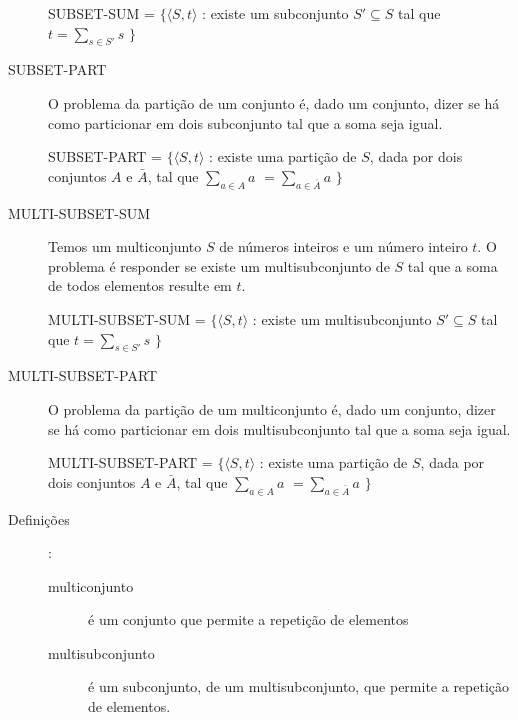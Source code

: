 \documentclass[12pt]{article}
\begin{document}
\begin{description}
SUBSET-SUM = $\{\langle S,t\rangle$ : existe um subconjunto $S'\subseteq S$ tal que $t = \sum_{s\in S'}s$ $\}$

\item[SUBSET-PART]

O problema da partição de um conjunto é, dado um conjunto, dizer se há como particionar em dois subconjunto tal que a soma seja igual.

SUBSET-PART = $\{\langle S,t\rangle$ : existe uma partição de $S$, dada por dois conjuntos $A$ e $\bar{A}$, tal que $\sum_{a\in A}a$ $ = \sum_{a\in \bar{A}} a$ $\}$

\item[MULTI-SUBSET-SUM]

Temos um multiconjunto $S$ de números inteiros e um número inteiro $t$. O problema é responder se existe um multisubconjunto de $S$ tal que a soma de todos elementos resulte em $t$.

MULTI-SUBSET-SUM = $\{\langle S,t\rangle$ : existe um multisubconjunto $S'\subseteq S$ tal que $t = \sum_{s\in S'}s$ $\}$

\item[MULTI-SUBSET-PART]

O problema da partição de um multiconjunto é, dado um conjunto, dizer se há como particionar em dois multisubconjunto tal que a soma seja igual.

MULTI-SUBSET-PART = $\{\langle S,t\rangle$ : existe uma partição de $S$, dada por dois conjuntos $A$ e $\bar{A}$, tal que $\sum_{a\in A}a$ $ = \sum_{a\in \bar{A}} a$ $\}$

\item[Definições]:

\begin{description}

\item[multiconjunto] é um conjunto que permite a repetição de elementos

\item[multisubconjunto] é um subconjunto, de um multisubconjunto, que permite a repetição de elementos.

\end{description}


\end{description}

\vspace{3em}
\end{document}
